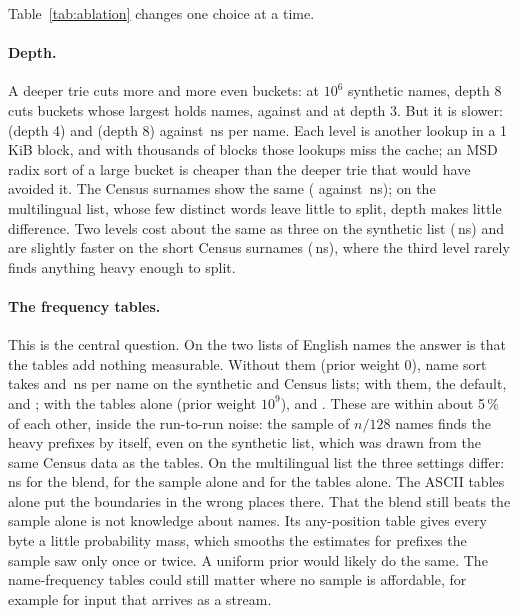 \documentclass[11pt]{article}
\theoremstyle{definition}
\begin{document}
Table~\ref{tab:ablation} changes one choice at a time.

\paragraph{Depth.} A deeper trie cuts more and more even buckets: at
$10^6$ synthetic names, depth 8 cuts  buckets
whose largest holds  names, against
 and  at
depth 3. But it is slower:  (depth 4) and
 (depth 8) against \,ns
per name. Each level is another lookup in a 1\,KiB block, and with thousands
of blocks those lookups miss the cache; an MSD radix sort of a large bucket
is cheaper than the deeper trie that would have avoided it. The Census
surnames show the same ( against
\,ns); on the multilingual list, whose few
distinct words leave little to split, depth makes little difference. Two levels
cost about the same as three on the synthetic list
(\,ns) and are slightly faster on the short Census
surnames (\,ns), where the third level
rarely finds anything heavy enough to split.

\paragraph{The frequency tables.} This is the central question. On the
two lists of English names the answer is that the tables add nothing
measurable. Without them (prior weight 0), name sort takes
 and \,ns
per name on the synthetic and Census lists; with them, the default,
 and ; with the
tables alone (prior weight $10^9$),  and
. These are within about 5\,\% of each
other, inside the run-to-run noise: the sample of $n/128$ names finds the
heavy prefixes by itself, even on the synthetic list, which was drawn from the
same Census data as the tables. On the multilingual list the three settings
differ: \,ns for the blend,
 for the sample alone and
 for the tables alone. The ASCII tables alone
put the boundaries in the wrong places there. That the blend still beats the
sample alone is not knowledge about names. Its any-position table gives every
byte a little probability mass, which smooths the estimates for prefixes the
sample saw only once or twice. A uniform prior would likely do the same. The
name-frequency tables could still matter where no sample is affordable, for
example for input that arrives as a stream.
\end{document}
